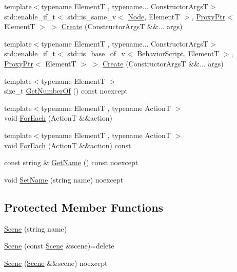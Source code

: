 \begin{DoxyCompactItemize}
\item 
{\footnotesize template$<$typename ElementT , typename... Constructor\+ArgsT$>$ }\\std\+::enable\+\_\+if\+\_\+t$<$ std\+::is\+\_\+same\+\_\+v$<$ \mbox{\hyperlink{classmage_1_1_node}{Node}}, ElementT $>$, \mbox{\hyperlink{classmage_1_1_proxy_ptr}{Proxy\+Ptr}}$<$ ElementT $>$ $>$ \mbox{\hyperlink{classmage_1_1_scene_a8ce3f5152ad4b0935a08cc2f0a53383c}{Create}} (Constructor\+ArgsT \&\&... args)
\item 
{\footnotesize template$<$typename ElementT , typename... Constructor\+ArgsT$>$ }\\std\+::enable\+\_\+if\+\_\+t$<$ std\+::is\+\_\+base\+\_\+of\+\_\+v$<$ \mbox{\hyperlink{classmage_1_1_behavior_script}{Behavior\+Script}}, ElementT $>$, \mbox{\hyperlink{classmage_1_1_proxy_ptr}{Proxy\+Ptr}}$<$ ElementT $>$ $>$ \mbox{\hyperlink{classmage_1_1_scene_ab135fe20ddadf6c1e2820a9582a31e64}{Create}} (Constructor\+ArgsT \&\&... args)
\item 
{\footnotesize template$<$typename ElementT $>$ }\\size\+\_\+t \mbox{\hyperlink{classmage_1_1_scene_a308480749d009dad3a39333fd0c59f2a}{Get\+Number\+Of}} () const noexcept
\item 
{\footnotesize template$<$typename ElementT , typename ActionT $>$ }\\void \mbox{\hyperlink{classmage_1_1_scene_a8bb2cd615a6c500677d4816fceb8cce3}{For\+Each}} (ActionT \&\&action)
\item 
{\footnotesize template$<$typename ElementT , typename ActionT $>$ }\\void \mbox{\hyperlink{classmage_1_1_scene_ac71dc52550c59256c30537b8dc9ca720}{For\+Each}} (ActionT \&\&action) const
\item 
const string \& \mbox{\hyperlink{classmage_1_1_scene_a6afd25c30d08eb579eb430af49cf8fc0}{Get\+Name}} () const noexcept
\item 
void \mbox{\hyperlink{classmage_1_1_scene_ae5e0a4daa62322ff18d673944ad4e0e8}{Set\+Name}} (string name) noexcept
\end{DoxyCompactItemize}
\subsection*{Protected Member Functions}
\begin{DoxyCompactItemize}
\item 
\mbox{\hyperlink{classmage_1_1_scene_aaed505892f2a639db47e5d5767f41337}{Scene}} (string name)
\item 
\mbox{\hyperlink{classmage_1_1_scene_a88d83ccb2e10549d5370f850b2b4c228}{Scene}} (const \mbox{\hyperlink{classmage_1_1_scene}{Scene}} \&scene)=delete
\item 
\mbox{\hyperlink{classmage_1_1_scene_afeae10a3a50bf1d624faa6bd0bf33a7d}{Scene}} (\mbox{\hyperlink{classmage_1_1_scene}{Scene}} \&\&scene) noexcept
\end{DoxyCompactItemize}
